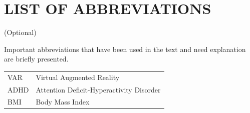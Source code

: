 \chapter*{LIST OF ABBREVIATIONS}

\onehalfspacing

(Optional)

Important abbreviations that have been used in the text and need explanation are briefly presented. 


\begin{tabular}{ l l }
 VAR & Virtual Augmented Reality  \\ 
 ADHD & Attention Deficit-Hyperactivity Disorder  \\  
 BMI & Body Mass Index     
\end{tabular}


